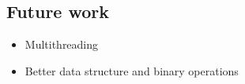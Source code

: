 \documentclass[a4paper]{article}
\begin{document}
\subsection{Future work}
\begin{itemize}
    \item Multithreading
    \item Better data structure and binary operations
\end{itemize}





%
%
\newpage

\end{document}

